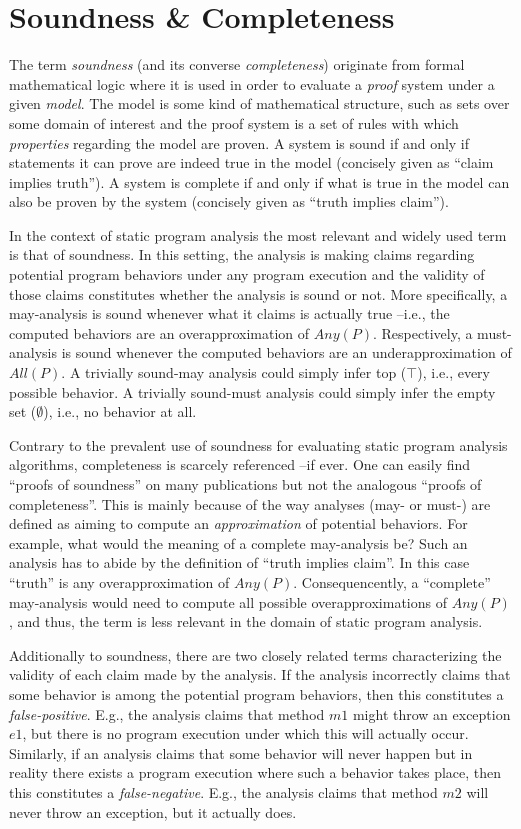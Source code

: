 \section{Soundness \& Completeness}

The term \emph{soundness} (and its converse \emph{completeness}) originate from
formal mathematical logic where it is used in order to evaluate a \emph{proof}
system under a given \emph{model}. The model is some kind of mathematical
structure, such as sets over some domain of interest and the proof system is a
set of rules with which \emph{properties} regarding the model are proven. A
system is sound if and only if statements it can prove are indeed true in the
model (concisely given as ``claim implies truth''). A system is complete if and
only if what is true in the model can also be proven by the system (concisely
given as ``truth implies claim'').

In the context of static program analysis the most relevant and widely used
term is that of soundness. In this setting, the analysis is making claims
regarding potential program behaviors under any program execution and the
validity of those claims constitutes whether the analysis is sound or not. More
specifically, a may-analysis is sound whenever what it claims is actually true
--i.e., the computed behaviors are an overapproximation of $Any(P)$.
Respectively, a must-analysis is sound whenever the computed behaviors are an
underapproximation of $All(P)$. A trivially sound-may analysis could simply
infer top ($\top$), i.e., every possible behavior. A trivially sound-must
analysis could simply infer the empty set ($\emptyset$), i.e., no behavior at
all.

Contrary to the prevalent use of soundness for evaluating static program
analysis algorithms, completeness is scarcely referenced --if ever. One can
easily find ``proofs of soundness'' on many publications but not the analogous
``proofs of completeness''. This is mainly because of the way analyses (may- or
must-) are defined as aiming to compute an \emph{approximation} of potential
behaviors. For example, what would the meaning of a complete may-analysis be?
Such an analysis has to abide by the definition of ``truth implies claim''. In
this case ``truth'' is any overapproximation of $Any(P)$. Consequencently, a
``complete'' may-analysis would need to compute all possible overapproximations
of $Any(P)$, and thus, the term is less relevant in the domain of static
program analysis.

Additionally to soundness, there are two closely related terms characterizing
the validity of each claim made by the analysis. If the analysis incorrectly
claims that some behavior is among the potential program behaviors, then this
constitutes a \emph{false-positive}. E.g., the analysis claims that method $m1$
might throw an exception $e1$, but there is no program execution under which
this will actually occur. Similarly, if an analysis claims that some behavior
will never happen but in reality there exists a program execution where such a
behavior takes place, then this constitutes a \emph{false-negative}. E.g., the
analysis claims that method $m2$ will never throw an exception, but it actually
does.

